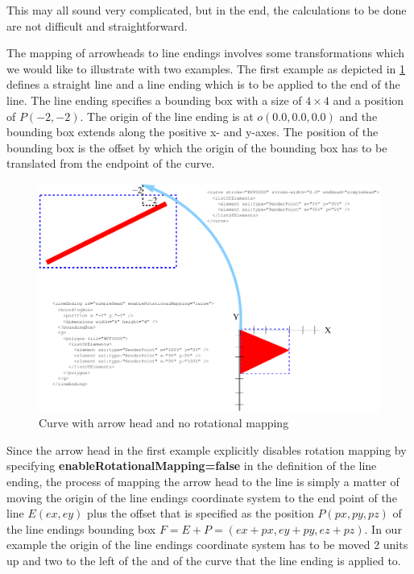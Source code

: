 This may all sound very complicated, but in the end, the calculations to be done are not difficult and straightforward. 

The mapping of arrowheads to line endings involves some transformations which we would like to illustrate with two examples.
The first example as depicted in \ref{fig:2ArrowHeadMapping} defines a straight line and a line ending which is to be applied
to the end of the line. The line ending specifies a bounding box with a size of $4\times4$ and a position of $P(-2,-2)$. 
The origin of the line ending is at $o(0.0,0.0,0.0)$ and the bounding box extends along the positive x- and y-axes.
The position of the bounding box is the offset by which the origin of the bounding box has to be translated from the endpoint of the curve.

\begin{figure}[!ht]
\begin{center}
\includegraphics{figures/ArrowHeadMapping2.pdf}
\end{center}
\caption{Curve with arrow head and no rotational mapping} \label{fig:2ArrowHeadMapping}
\end{figure}

Since the arrow head in the first example explicitly disables rotation mapping by specifying \textbf{enableRotationalMapping=false}
in the definition of the line ending, the process of mapping the arrow head to the line is simply a matter of moving the origin of 
the line endings coordinate system to the end point of the line $E(ex,ey)$ plus the offset that is specified as the position $P(px,py,pz)$ of the line endings bounding box $F=E+P=(ex+px,ey+py,ez+pz)$. In our example the origin of the line endings coordinate system has to be moved 2 units up and two to the left of the and of the curve that the line ending is applied to.


